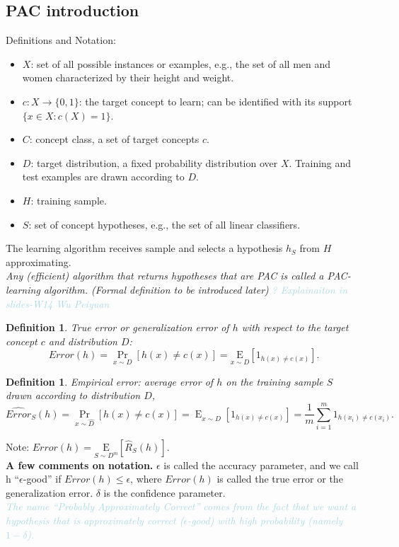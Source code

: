\documentclass[12pt, a4paper, oneside]{article}
\newtheorem{definition}[theorem]{Definition}
\begin{document}
\subsection{PAC introduction}
Definitions and Notation:
\begin{itemize}
    \item $X$: set of all possible instances or examples, e.g., 
    the set of all men and women characterized by their height and weight.
    \item $c: X \rightarrow \{0, 1\}$: the target concept to learn; can be identified with its support $\{x \in X: c(X)=1\}$.
    \item $C$: concept class, a set of target concepts $c$.
    \item $D$: target distribution, a fixed probability distribution over $X$. Training and test examples are drawn according to $D$.
    \item $H$: training sample.
    \item $S$: set of concept hypotheses, e.g., the set of all linear classifiers. 
\end{itemize}
The learning algorithm receives sample and selects a hypothesis $h_S$ from $H$ approximating.
\\\textit{Any (efficient) algorithm that returns hypotheses that are PAC is called a PAC-learning algorithm. 
(Formal definition to be introduced later)} \textit{\textcolor{lightBlue}{? Explainaiton in slides-W14 Wu Peiyuan}}
\begin{definition}
    True error or generalization error of $h$ with respect to the target concept $c$ and distribution $D$:
    \begin{equation*}
        Error(h)=\operatorname{Pr}_{x \sim D}[h(x) \neq c(x)]=\underset{x \sim D}{\mathrm{E}}\left[1_{h(x) \neq c(x)}\right] .
    \end{equation*}    
\end{definition}
\begin{definition}
    Empirical error: average error of $ h $ on the training sample $ S $ drawn according to distribution $ D $,
    \begin{equation*}
        \widehat{Error}_{S}(h)=\operatorname{Pr}_{x \sim \widehat{D}}[h(x) \neq c(x)]=\operatorname{E}_{x \sim \widehat{D}}\left[1_{h(x) \neq c(x)}\right]=\frac{1}{m} \sum_{i=1}^{m} 1_{h\left(x_{i}\right) \neq c\left(x_{i}\right)} .
    \end{equation*}
\end{definition}
Note: $ Error(h)=\underset{S \sim D^{m}}{\mathrm{E}}\left[\widehat{R}_{S}(h)\right]$.
\\ \textbf{A few comments on notation.} $\epsilon$ is called the accuracy parameter, and we call h “$\epsilon $-good”
if $Error(h) \leq \epsilon $, where $Error(h)$ is called the true error or the generalization error. $\delta$ is
the confidence parameter.
\\ \textit{\textcolor{lightBlue}{The
name “Probably Approximately Correct” comes from the fact that we want a hypothesis
that is approximately correct ($\epsilon $-good) with high probability (namely $1- \delta$).}}
\end{document}
